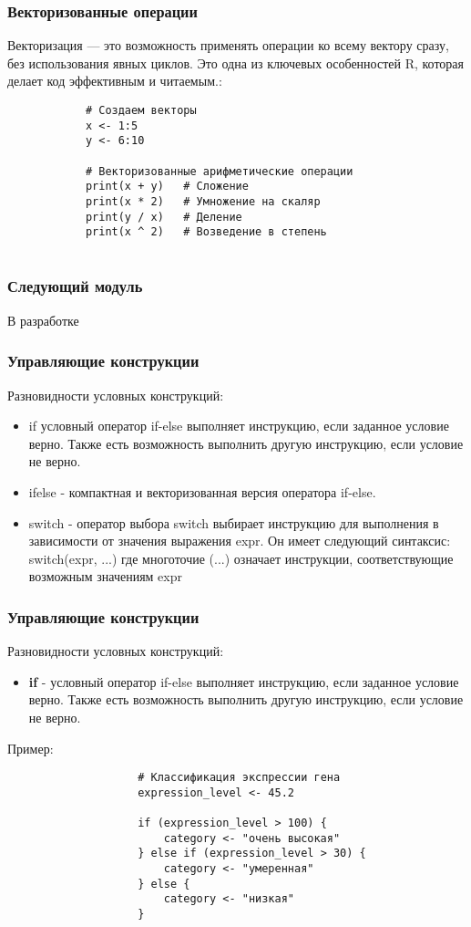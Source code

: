 \documentclass[10pt]{beamer}
\begin{document}
	
	
	
	\begin{frame}[fragile]
		\frametitle{Векторизованные операции}
		Векторизация — это возможность применять операции ко всему вектору сразу, без использования явных циклов. Это одна из ключевых особенностей R, которая делает код эффективным и читаемым.:
		\begin{verbatim}
			# Создаем векторы
			x <- 1:5
			y <- 6:10
			
			# Векторизованные арифметические операции
			print(x + y)   # Сложение
			print(x * 2)   # Умножение на скаляр
			print(y / x)   # Деление
			print(x ^ 2)   # Возведение в степень       
			
		\end{verbatim}
	\end{frame}
	
	
	\begin{frame}[fragile]
		\frametitle{Следующий модуль}
		В разработке
	\end{frame}
	
	
	\begin{frame}
		\frametitle{Управляющие конструкции}
		Разновидности условных конструкций:
		\begin{itemize}
			\item if условный оператор if-else выполняет инструкцию, если заданное условие верно. Также есть возможность выполнить другую инструкцию, если условие не верно.
			
			\item ifelse - компактная и векторизованная версия оператора if-else.
			
			\item switch - оператор выбора switch выбирает инструкцию для выполнения в зависимости от значения выражения expr. Он имеет следующий синтаксис: switch(expr, ...) где многоточие (...) означает инструкции, соответствующие возможным значениям expr
		\end{itemize}
	\end{frame}	
	
	\begin{frame}[fragile]
		\frametitle{Управляющие конструкции}
		Разновидности условных конструкций:
		\begin{itemize}
			\item \textbf{if} - условный оператор if-else выполняет инструкцию, если заданное условие верно. Также есть возможность выполнить другую инструкцию, если условие не верно.
		\end{itemize}
		
		\begin{exampleblock}{Пример:}
			{\footnotesize
				\begin{verbatim}
					# Классификация экспрессии гена
					expression_level <- 45.2
					
					if (expression_level > 100) {
						category <- "очень высокая"
					} else if (expression_level > 30) {
						category <- "умеренная"
					} else {
						category <- "низкая"
					}
					
				\end{verbatim}
			}
		\end{exampleblock}
	\end{frame}
	
\end{document}
